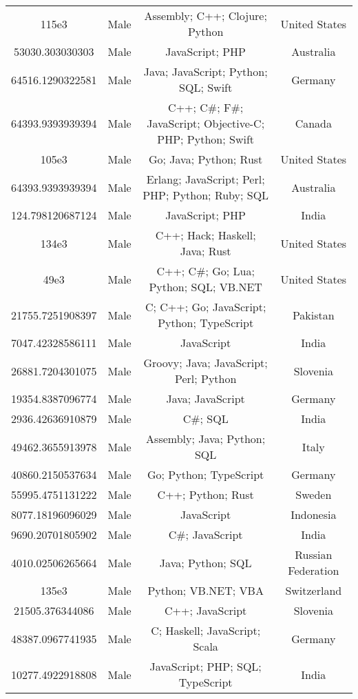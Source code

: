 \begin{center}
\begin{tabular}{ |c|c|c|c| }
115e3  &  Male  &  Assembly; C++; Clojure; Python  &  United States  \\ 
53030.303030303  &  Male  &  JavaScript; PHP  &  Australia  \\ 
64516.1290322581  &  Male  &  Java; JavaScript; Python; SQL; Swift  &  Germany  \\ 
64393.9393939394  &  Male  &  C++; C\#; F\#; JavaScript; Objective-C; PHP; Python; Swift  &  Canada  \\ 
105e3  &  Male  &  Go; Java; Python; Rust  &  United States  \\ 
64393.9393939394  &  Male  &  Erlang; JavaScript; Perl; PHP; Python; Ruby; SQL  &  Australia  \\ 
124.798120687124  &  Male  &  JavaScript; PHP  &  India  \\ 
134e3  &  Male  &  C++; Hack; Haskell; Java; Rust  &  United States  \\ 
49e3  &  Male  &  C++; C\#; Go; Lua; Python; SQL; VB.NET  &  United States  \\ 
21755.7251908397  &  Male  &  C; C++; Go; JavaScript; Python; TypeScript  &  Pakistan  \\ 
7047.42328586111  &  Male  &  JavaScript  &  India  \\ 
26881.7204301075  &  Male  &  Groovy; Java; JavaScript; Perl; Python  &  Slovenia  \\ 
19354.8387096774  &  Male  &  Java; JavaScript  &  Germany  \\ 
2936.42636910879  &  Male  &  C\#; SQL  &  India  \\ 
49462.3655913978  &  Male  &  Assembly; Java; Python; SQL  &  Italy  \\ 
40860.2150537634  &  Male  &  Go; Python; TypeScript  &  Germany  \\ 
55995.4751131222  &  Male  &  C++; Python; Rust  &  Sweden  \\ 
8077.18196096029  &  Male  &  JavaScript  &  Indonesia  \\ 
9690.20701805902  &  Male  &  C\#; JavaScript  &  India  \\ 
4010.02506265664  &  Male  &  Java; Python; SQL  &  Russian Federation  \\ 
135e3  &  Male  &  Python; VB.NET; VBA  &  Switzerland  \\ 
21505.376344086  &  Male  &  C++; JavaScript  &  Slovenia  \\ 
48387.0967741935  &  Male  &  C; Haskell; JavaScript; Scala  &  Germany  \\ 
10277.4922918808  &  Male  &  JavaScript; PHP; SQL; TypeScript  &  India  \\ 

\end{tabular}
\end{center}
